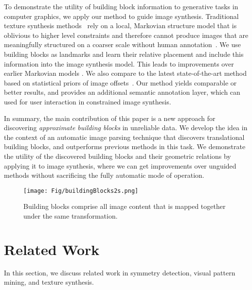 \documentclass{acmtog}
\begin{document}
To demonstrate the utility of building block information to generative tasks in computer graphics, we apply our method to guide image synthesis. Traditional texture synthesis methods~\cite{EfrosL99NP,Wei2000FT,Kwatra2003Graphcut,Kwatra2005TO} rely on a local, Markovian structure model that is oblivious to higher level constraints and therefore cannot produce images that are meaningfully structured on a coarser scale without human annotation~\cite{Hertzmann2001IA}. We use building blocks as landmarks and learn their relative placement and include this information into the image synthesis model. This leads to improvements over earlier Markovian models \cite{Kwatra2005TO}. We also compare to the latest state-of-the-art method based on statistical priors of image offsets~\cite{He2012PO}. Our method yields comparable or better results, and provides an additional semantic annotation layer, which can used for user interaction in constrained image synthesis.

In summary, the main contribution of this paper is a new approach for discovering \emph{approximate building blocks} in unreliable data. We develop the idea in the context of an automatic image parsing technique that discovers translational building blocks, and outperforms previous methods in this task. We demonstrate the utility of the discovered building blocks and their geometric relations by applying it to image synthesis, where we can get improvements over unguided methods without sacrificing the fully automatic mode of operation.

\begin{figure}
	\centering
		\texttt{[image: Fig/buildingBlocks2s.png]}
	\caption{Building blocks comprise all image content that is mapped together under the same transformation.}
	\label{fig:buildingBlocks}
\end{figure}

\section{Related Work}
\label{sec:RelatedWork}

In this section, we discuss related work in symmetry detection, visual pattern mining, and texture synthesis.
\end{document}
